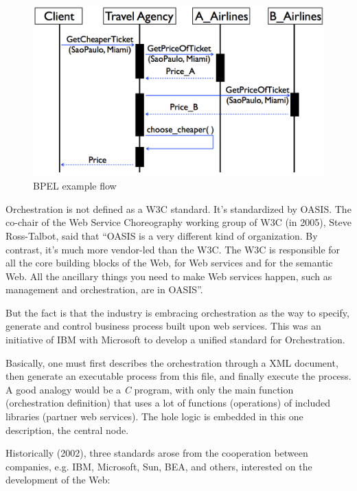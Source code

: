 \begin{figure}[htb]
  \centering
  \includegraphics[width=\textwidth]{images/BPELexample}
  \caption{BPEL example flow}
  \label{BPELexample}
\end{figure}

Orchestration is not defined as a W3C standard. It's standardized by OASIS. The co-chair of the Web Service Choreography working group of W3C (in 2005), Steve Ross-Talbot, said that ``OASIS is a very different kind of organization. By contrast, it's much more vendor-led than the W3C. The W3C is responsible for all the core building blocks of the Web, for Web services and for the semantic Web. All the ancillary things you need to make Web services happen, such as management and orchestration, are in OASIS''. \citep{INTERVIEW}

But the fact is that the industry is embracing orchestration as the way to specify, generate and control business process built upon web services. This was an initiative of IBM with Microsoft to develop a unified standard for Orchestration.

Basically, one must first describes the orchestration through a XML document, then generate an executable process from this file, and finally execute the process. A good analogy would be a \emph{C} program, with only the main function (orchestration definition) that uses a lot of functions (operations) of included libraries (partner web services). The hole logic is embedded in this one description, the central node. 

Historically (2002), three standards arose from the cooperation between companies, e.g. IBM, Microsoft, Sun, BEA, and others, interested on the development of the Web:

